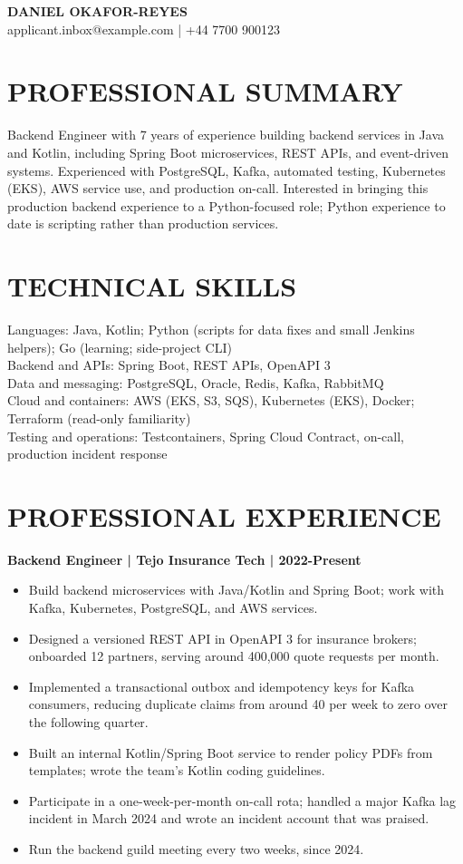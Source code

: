 \documentclass[11pt,a4paper]{article}
\begin{document}
\begin{center}
{\Huge\bfseries\color{primarycolor} DANIEL OKAFOR-REYES}\\[0.4em]
applicant.inbox@example.com \quad | \quad +44 7700 900123
\end{center}

\section*{PROFESSIONAL SUMMARY}
Backend Engineer with 7 years of experience building backend services in Java and Kotlin, including Spring Boot microservices, REST APIs, and event-driven systems. Experienced with PostgreSQL, Kafka, automated testing, Kubernetes (EKS), AWS service use, and production on-call. Interested in bringing this production backend experience to a Python-focused role; Python experience to date is scripting rather than production services.

\section*{TECHNICAL SKILLS}
Languages: Java, Kotlin; Python (scripts for data fixes and small Jenkins helpers); Go (learning; side-project CLI)\\
Backend and APIs: Spring Boot, REST APIs, OpenAPI 3\\
Data and messaging: PostgreSQL, Oracle, Redis, Kafka, RabbitMQ\\
Cloud and containers: AWS (EKS, S3, SQS), Kubernetes (EKS), Docker; Terraform (read-only familiarity)\\
Testing and operations: Testcontainers, Spring Cloud Contract, on-call, production incident response

\section*{PROFESSIONAL EXPERIENCE}
\textbf{Backend Engineer | Tejo Insurance Tech | 2022-Present}
\begin{itemize}
\item Build backend microservices with Java/Kotlin and Spring Boot; work with Kafka, Kubernetes, PostgreSQL, and AWS services.
\item Designed a versioned REST API in OpenAPI 3 for insurance brokers; onboarded 12 partners, serving around 400,000 quote requests per month.
\item Implemented a transactional outbox and idempotency keys for Kafka consumers, reducing duplicate claims from around 40 per week to zero over the following quarter.
\item Built an internal Kotlin/Spring Boot service to render policy PDFs from templates; wrote the team's Kotlin coding guidelines.
\item Participate in a one-week-per-month on-call rota; handled a major Kafka lag incident in March 2024 and wrote an incident account that was praised.
\item Run the backend guild meeting every two weeks, since 2024.
\end{itemize}
\end{document}

